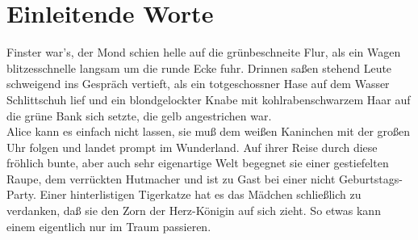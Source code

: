 \documentclass[12pt]{scrreprt}
\begin{document}
\section{Einleitende Worte}
Finster war's, der Mond schien helle auf die grünbeschneite Flur, als
ein Wagen blitzesschnelle langsam um die runde Ecke fuhr. Drinnen
saßen stehend Leute schweigend ins Gespräch vertieft, als ein
totgeschossner Hase auf dem Wasser Schlittschuh lief und ein
blondgelockter Knabe mit kohlrabenschwarzem Haar auf die grüne Bank
sich setzte, die gelb angestrichen war. \\

Alice kann es einfach nicht lassen, sie muß dem weißen Kaninchen mit
der großen Uhr folgen und landet prompt im Wunderland. Auf ihrer Reise
durch diese fröhlich bunte, aber auch sehr eigenartige Welt begegnet
sie einer gestiefelten Raupe, dem verrückten Hutmacher und ist zu Gast
bei einer nicht Geburtstags-Party. Einer hinterlistigen Tigerkatze hat
es das Mädchen schließlich zu verdanken, daß sie den Zorn der
Herz-Königin auf sich zieht. So etwas kann einem eigentlich nur im
Traum passieren.
\end{document}
